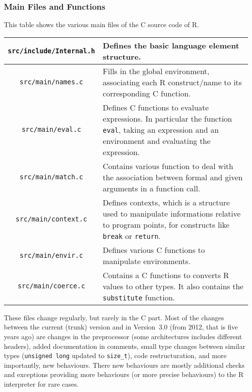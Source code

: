 \documentclass{article}
\newcommand\R{R}
\newcommand\Cn{C}
\begin{document}
\subsubsection{Main Files and Functions}
\label{sec:files}

This table shows the various main files of the \Cn{} source code of \R{}.

\begin{tabular}{|c|p{7cm}|}
    \hline
    \texttt{src/include/Internal.h} & Defines the basic language element structure. \\
    \hline
    \texttt{src/main/names.c} & Fills in the global environment, associating each \R{} construct/name to its corresponding \Cn{} function. \\
    \hline
    \texttt{src/main/eval.c} & Defines \Cn{} functions to evaluate expressions. In particular the function \texttt{eval}, taking an expression and an environment and evaluating the expression. \\
    \hline
    \texttt{src/main/match.c} & Contains various function to deal with the association between formal and given arguments in a function call. \\
    \hline
    \texttt{src/main/context.c} & Defines contexts, which is a structure used to manipulate informations relative to program points, for constructs like \texttt{break} or \texttt{return}. \\
    \hline
    \texttt{src/main/envir.c} & Defines various \Cn{} functions to manipulate environments. \\
    \hline
    \texttt{src/main/coerce.c} & Contains a \Cn{} functions to converts \R{} values to other types. It also contains the \texttt{substitute} function. \\
    \hline
\end{tabular}

These files change regularly,
but rarely in the \Cn{} part.
Most of the changes between the current (trunk) version
and in Version~\(3.0\) (from 2012, that is five years ago)
are changes in the preprocessor
(some architectures includes different headers),
added documentation in comments,
small type changes between similar types
(\texttt{unsigned long} updated to \texttt{size_t}),
code restructuration,
and more importantly,
new behaviours.
There new behaviours are mostly additional checks
and exceptions providing more behaviours
(or more precise behaviours) to the \R{} interpreter
for rare cases.
\end{document}
